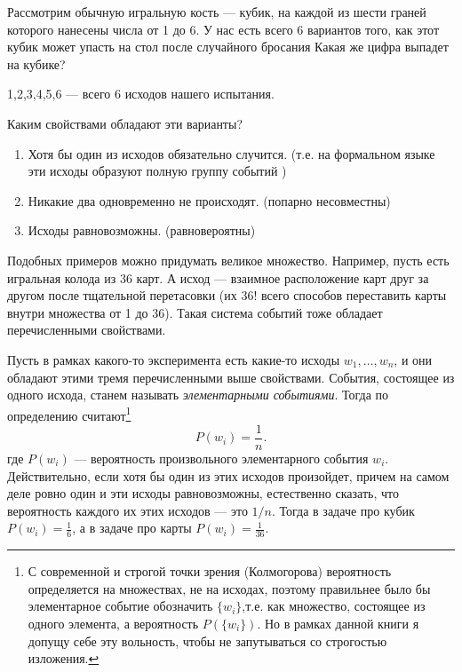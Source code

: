Рассмотрим обычную игральную кость --- кубик, на каждой из шести граней которого нанесены числа от 1 до 6. У нас есть всего 6 вариантов того, как этот кубик может упасть на стол после случайного бросания Какая же цифра выпадет на кубике? 
\begin{center}
1,2,3,4,5,6 --- всего 6 исходов нашего испытания.
\end{center}
Каким свойствами обладают эти варианты?
\begin{enumerate}
\item Хотя бы один из исходов обязательно случится. (т.е. на формальном языке эти исходы образуют полную группу событий )
\item Никакие два одновременно не происходят. (попарно несовместны)
\item Исходы равновозможны. (равновероятны)
\end{enumerate}

Подобных примеров можно придумать великое множество. Например, пусть есть игральная колода из 36 карт. А исход --- взаимное расположение карт друг за другом после тщательной перетасовки (их 36! всего способов переставить карты внутри множества от 1 до 36). Такая система событий тоже обладает перечисленными свойствами.

Пусть в рамках какого-то эксперимента есть какие-то исходы $w_1, \dots,w_n$, и они обладают этими тремя перечисленными выше свойствами. События, состоящее из одного исхода, станем называть \textit{элементарными событиями}. Тогда по определению считают\footnote{С современной и строгой точки зрения (Колмогорова) вероятность определяется на множествах, не на исходах, поэтому правильнее было бы элементарное событие обозначить $\{w_i\}$,т.е. как множество, состоящее из одного элемента, а вероятность $P(\{w_i\})$. Но в рамках данной книги я допущу себе эту вольность, чтобы не запутываться со строгостью изложения.}
$$
P(w_i)=\frac{1}{n}.
$$
где $P(w_i)$ --- вероятность произвольного элементарного события $w_i$. Действительно, если хотя бы один из этих исходов произойдет, причем на самом деле ровно один и эти исходы равновозможны, естественно сказать, что вероятность каждого их этих исходов --- это $1/n$. Тогда в задаче про кубик $P(w_i) =\frac{1}{6}$, а в задаче про карты $P(w_i) = \frac{1}{36}$.

